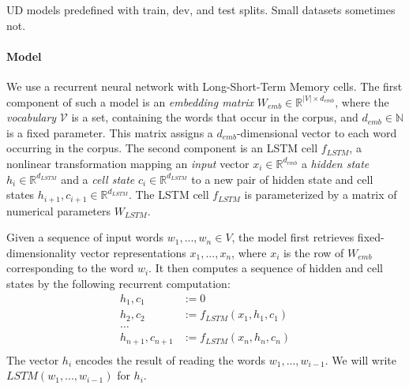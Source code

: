 \documentclass[11pt,letterpaper]{article}
\begin{document}
UD models predefined with train, dev, and test splits.
Small datasets sometimes not.

\paragraph{Model}
We use a recurrent neural network with Long-Short-Term Memory cells.
%
The first component of such a model is an \emph{embedding matrix} $W_{emb} \in \mathbb{R}^{|V| \times d_{emb}}$, where the \emph{vocabulary} $\mathcal{V}$ is a set, containing the words that occur in the corpus, and $d_{emb} \in \mathbb{N}$ is a fixed parameter.
This matrix assigns a $d_{emb}$-dimensional vector to each word occurring in the corpus.
The second component is an LSTM cell $f_{LSTM}$, a nonlinear transformation mapping an \emph{input} vector $x_{i} \in \mathbb{R}^{d_{emb}}$ a \emph{hidden state} $h_i \in \mathbb{R}^{d_{LSTM}}$ and a \emph{cell state} $c_i \in \mathbb{R}^{d_{LSTM}}$ to a new pair of hidden state and cell states $h_{i+1}, c_{i+1} \in \mathbb{R}^{d_{LSTM}}$.
The LSTM cell $f_{LSTM}$ is parameterized by a matrix of numerical parameters $W_{LSTM}$.

Given a sequence of input words $w_1, ..., w_n \in V$, the model first retrieves fixed-dimensionality vector representations $x_1, ..., x_n$, where $x_i$ is the row of $W_{emb}$ corresponding to the word $w_i$.
It then computes a sequence of hidden and cell states by the following recurrent computation:
\begin{align*}
	h_1, c_1 &:= 0 \\
	h_2, c_2 &:= f_{LSTM}(x_1, h_1, c_1) \\
	\dots \\
	h_{n+1}, c_{n+1} &:= f_{LSTM}(x_n, h_n, c_n) \\
\end{align*}
The vector $h_i$ encodes the result of reading the words $w_1, ..., w_{i-1}$.
We will write $LSTM(w_1, ..., w_{i-1})$ for $h_i$.
\end{document}
